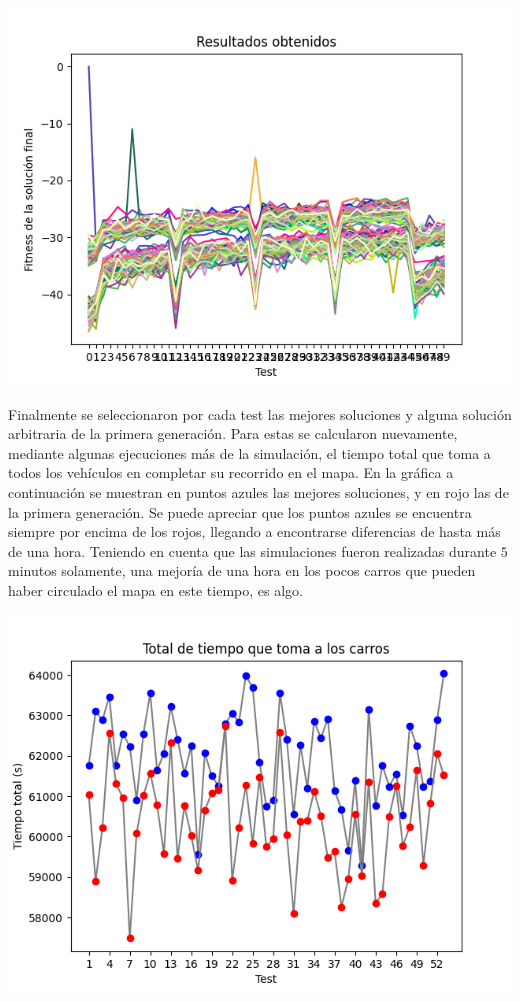 \documentclass[colorinlistoftodos,twoside,twocolumn]{article} %
\begin{document}
	\begin{center}
		\includegraphics[width=\columnwidth]{all_graphics.png}
	\end{center}

	Finalmente se seleccionaron por cada test las mejores soluciones y alguna soluci\'on arbitraria de la primera generaci\'on. Para estas se calcularon nuevamente, mediante algunas ejecuciones m\'as de la simulaci\'on, el tiempo total que toma a todos los veh\'iculos en completar su recorrido en el mapa. En la gr\'afica a continuaci\'on se muestran en puntos azules las mejores soluciones, y en rojo las de la primera generaci\'on. Se puede apreciar que los puntos azules se encuentra siempre por encima de los rojos, llegando a encontrarse diferencias de hasta m\'as de una hora. Teniendo en cuenta que las simulaciones fueron realizadas durante $5$ minutos solamente, una mejor\'ia de una hora en los pocos carros que pueden haber circulado el mapa en este tiempo, es algo.
	
	\begin{center}
		\includegraphics[width=\columnwidth]{graphic_total_time_take_cars.png}
	\end{center}
\end{document}
